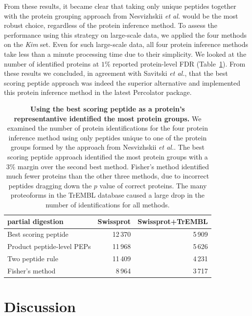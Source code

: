 \documentclass{article}
\begin{document}
From these results, it became clear that taking only unique peptides
together with the protein grouping approach from Nesvizhskii {\em et
al.} would be the most robust choice, regardless of the protein
inference method. To assess the performance using this strategy on
large-scale data, we applied the four methods on the {\em Kim} set.
Even for such large-scale data, all four protein inference methods
take less than a minute processing time due to their simplicity. We
looked at the number of identified proteins at $1\%$ reported
protein-level FDR (Table~\ref{tab:pandey-stats}). From these results
we concluded, in agreement with Savitski {\em et al.}, that the best
scoring peptide approach was indeed the superior alternative and
implemented this protein inference method in the latest Percolator
package. 

\begin{table}[!htp]
  \begin{center}
    \begin{tabular}{|l|r|r|}
    \hline
    partial digestion & Swissprot & Swissprot+TrEMBL\\
    \hline
    Best scoring peptide & 12\,370 & 5\,909\\
    \hline
    Product peptide-level PEPs & 11\,968 & 5\,626\\
    \hline
    Two peptide rule & 11\,409 & 4\,231\\
    \hline
    Fisher's method & 8\,964 & 3\,717\\
    \hline
    \end{tabular}
  \end{center}
  \caption{\label{tab:pandey-stats}\textbf{Using the best scoring
peptide as a protein's representantive identified the most protein
groups.} We examined the number of protein identifications for the
four protein inference method using only peptides unique to one of
the protein groups formed by the approach from Nesvizhskii {\em et
al.}. The best scoring peptide approach identified the most protein
groups with a $3\%$ margin over the second best method. Fisher's
method identified much fewer proteins than the other three methods,
due to incorrect peptides dragging down the $p$ value of correct
proteins. The many proteoforms in the TrEMBL database caused a large
drop in the number of identifications for all methods.}
\end{table}

\section*{Discussion}
\end{document}
